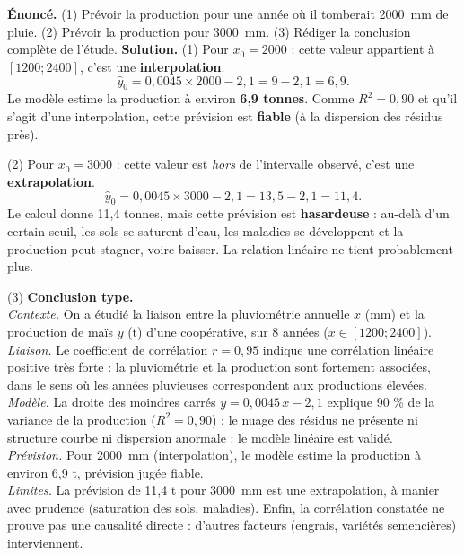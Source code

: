 \documentclass[11pt]{article}
\begin{document}
\begin{exoresolu}
\textbf{Énoncé.} (1) Prévoir la production pour une année où il tomberait \SI{2000}{mm} de pluie. (2) Prévoir la production pour \SI{3000}{mm}. (3) Rédiger la conclusion complète de l'étude.
\tcblower
\textbf{Solution.}
(1) Pour $x_0 = 2000$ : cette valeur appartient à $[1200 ; 2400]$, c'est une \textbf{interpolation}.
\[ \hat{y}_0 = 0{,}0045 \times 2000 - 2{,}1 = 9 - 2{,}1 = 6{,}9. \]
Le modèle estime la production à environ \textbf{6,9 tonnes}. Comme $R^2 = 0{,}90$ et qu'il s'agit d'une interpolation, cette prévision est \textbf{fiable} (à la dispersion des résidus près).

(2) Pour $x_0 = 3000$ : cette valeur est \emph{hors} de l'intervalle observé, c'est une \textbf{extrapolation}.
\[ \hat{y}_0 = 0{,}0045 \times 3000 - 2{,}1 = 13{,}5 - 2{,}1 = 11{,}4. \]
Le calcul donne 11,4 tonnes, mais cette prévision est \textbf{hasardeuse} : au-delà d'un certain seuil, les sols se saturent d'eau, les maladies se développent et la production peut stagner, voire baisser. La relation linéaire ne tient probablement plus.

(3) \textbf{Conclusion type.} \\
\emph{Contexte.} On a étudié la liaison entre la pluviométrie annuelle $x$ (mm) et la production de maïs $y$ (t) d'une coopérative, sur 8 années ($x \in [1200 ; 2400]$). \\
\emph{Liaison.} Le coefficient de corrélation $r = 0{,}95$ indique une corrélation linéaire positive très forte : la pluviométrie et la production sont fortement associées, dans le sens où les années pluvieuses correspondent aux productions élevées. \\
\emph{Modèle.} La droite des moindres carrés $y = 0{,}0045\,x - 2{,}1$ explique 90 \% de la variance de la production ($R^2 = 0{,}90$) ; le nuage des résidus ne présente ni structure courbe ni dispersion anormale : le modèle linéaire est validé. \\
\emph{Prévision.} Pour \SI{2000}{mm} (interpolation), le modèle estime la production à environ 6,9 t, prévision jugée fiable. \\
\emph{Limites.} La prévision de 11,4 t pour \SI{3000}{mm} est une extrapolation, à manier avec prudence (saturation des sols, maladies). Enfin, la corrélation constatée ne prouve pas une causalité directe : d'autres facteurs (engrais, variétés semencières) interviennent.
\end{exoresolu}
\end{document}
